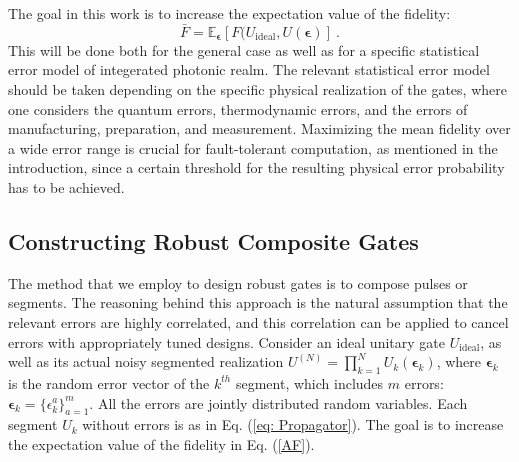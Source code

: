 \documentclass[floatfix,reprint, amsmath,amssymb,aps,superscriptaddress,nofootinbib]{revtex4-2}
\DeclareMathOperator{\Tr}{Tr}
\newcommand{\bp}{\boldsymbol{\epsilon}}
\begin{document}
The goal in this work is to increase the expectation value
of the fidelity: 
\begin{equation}
    \bar{F} = \mathbb{E}_{\bp}[F(U_\mathrm{ideal},U(\bp)] \ .
    \label{AF}
\end{equation}
This will be done both for the general case as well as for a specific statistical error model of integerated photonic realm. The relevant statistical error model should be taken depending on the specific physical realization of the gates, where one considers the quantum errors, thermodynamic errors, and the errors of manufacturing, preparation, and measurement. 
Maximizing the mean fidelity over a wide error range is crucial for fault-tolerant computation, as mentioned in the introduction, since a certain  threshold for the resulting physical error probability has to be achieved.


\subsection{Constructing Robust Composite Gates}

The method that we employ to design robust gates is to compose pulses or segments. The reasoning
behind this approach is the natural assumption that the relevant errors are highly correlated, and this correlation can be applied to cancel errors with appropriately tuned designs.
Consider an ideal unitary gate $U_\mathrm{ideal}$, as well as its actual noisy segmented realization $U^{(N)}=\prod_{k=1}^N U_k(\bp_k)$, where $\bp_k$ is the random error vector of the $k^{th}$ segment, which includes $m$ errors: $\bp_k=\{ \epsilon_k^a \}_{a=1}^m$. All the errors are jointly distributed random variables. Each segment $U_k$ without errors is as in Eq. (\ref{eq: Propagator}).
The goal is to increase the expectation value
of the fidelity in Eq. (\ref{AF}).
\end{document}
